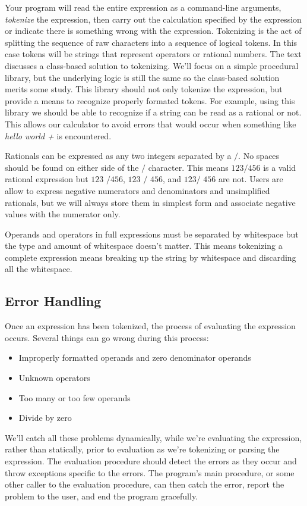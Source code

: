 \documentclass[10pt]{article}
\begin{document}
Your program will read the entire expression as a command-line arguments, \textit{tokenize} the expression, then carry out the calculation specified by the expression or indicate there is something wrong with the expression. Tokenizing is the act of splitting the sequence of raw characters into a sequence of logical tokens. In this case tokens will be strings that represent operators or rational numbers.  The text discusses a class-based solution to tokenizing. We'll focus on a simple procedural library, but the underlying logic is still the same so the class-based solution merits some study. This library should not only tokenize the expression, but provide a means to recognize properly formated tokens. For example, using this library we should be able to recognize if a string can be read as a rational or not. This allows our calculator to avoid errors that would occur when something like \textit{hello world +} is encountered.

Rationals can be expressed as any two integers separated by a $/$. No spaces should be found on either side of the $/$ character. This means $123/456$ is a valid rational expression but $123$ $/456$, $123$ $/$ $456$, and $123/$ $456$ are not. Users are allow to express negative numerators and denominators and unsimplified rationals, but we will always store them in simplest form and associate negative values with the numerator only.

Operands and operators in full expressions must be separated by whitespace but the type and amount of whitespace doesn't matter. This means tokenizing a complete expression means breaking up the string by whitespace and discarding all the whitespace.

\subsection*{Error Handling}

Once an expression has been tokenized, the process of evaluating the expression occurs. Several things can go wrong during this process:
\begin{itemize}
  \item Improperly formatted operands and zero denominator operands
  \item Unknown operators
  \item Too many or too few operands
  \item Divide by zero
\end{itemize}
We'll catch all these problems dynamically, while we're evaluating the expression, rather than statically, prior to evaluation as we're tokenizing or parsing the expression. The evaluation procedure should detect the errors as they occur and throw exceptions specific to the errors. The program's main procedure, or some other caller to the evaluation procedure, can then catch the error, report the problem to the user, and end the program gracefully.
\end{document}
